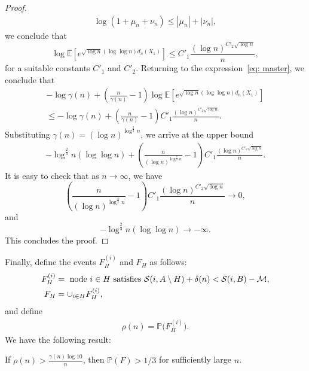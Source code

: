 \begin{proof}
\begin{align*}
\log (1 + \mu_n + \nu_n) \leq |\mu_n| +|\nu_n|,
\end{align*}
we conclude that
\begin{equation*}
\log \mathbb E\left[e^{\sqrt{\log n}(\log\log n) d_n(X_1)} \right] \leq C'_1 \frac{(\log n)^{C'_2\sqrt{\log n}}}{n},
\end{equation*}
for a suitable constants $C'_1$ and $C'_2$. Returning to the expression~\eqref{eq: master}, we conclude that
\begin{multline*}
-\log \gamma(n) +  \left(\frac{n}{\gamma(n)}-1\right)\log \mathbb E\left[e^{\sqrt{\log n} (\log\log n) d_n(X_1)} \right] \\
%
\le -\log \gamma(n) + \left(\frac{n}{\gamma(n)}-1\right) C'_1 \frac{(\log n)^{C'_2\sqrt{\log n}}}{n}.
\end{multline*}
Substituting $\gamma(n) = (\log n)^{\log^{\frac{2}{3}} n}$, we arrive at the upper bound
\begin{align*}
-\log^{\frac{2}{3}}n(\log\log n) + \left(\frac{n}{(\log n)^{\log^{\frac{2}{3}} n}} - 1\right)C'_1 \frac{(\log n)^{C'_2\sqrt{\log n}}}{n}.
\end{align*}
It is easy to check that as $n \rightarrow \infty$, we have
$$\left(\frac{n}{(\log n)^{\log^{\frac{2}{3}} n}} - 1\right)C'_1 \frac{(\log n)^{C'_2\sqrt{\log n}}}{n} \to 0,$$
and
$$-\log^{\frac{2}{3}}n(\log\log n) \to -\infty.$$
This concludes the proof.
\end{proof}

Finally, define the events $F_H^{(i)}$ and $F_H$ as follows:
\begin{align*}
F_H^{(i)} &= \text{ node $i \in H$ satisfies } {\cal S}(i, A \setminus H) + \delta(n) <  {\cal S}(i, B) - {\mathcal{M}},\\
F_H &= \cup_{i \in H} F_H^{(i)},
\end{align*}
and define
\begin{align}
\label{EqnDefnRho}
\rho(n) = \mathbb P\Big(F_H^{(i)}\Big).
\end{align}
We have the following result:
\begin{lemma}\label{lemma: final blow}
If $\rho(n) > \frac{\gamma(n)\log 10}{n}$, then $\mathbb P(F) > 1/3$ for sufficiently large $n$.
\end{lemma}

